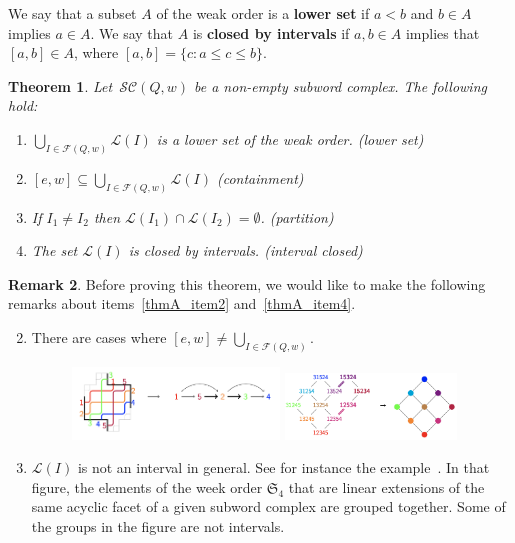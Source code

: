 \documentclass{amsart}
\newtheorem{theorem}{Theorem}[section]
\theoremstyle{definition}
\newtheorem{remark}[theorem]{Remark}
\newcommand{\defn}[1]{\textbf{\textsf{\color{PineGreen} #1}}} %
\newcommand{\cesarm}[1]{\todo[color=orange!30]{#1 \\ \hfill --- C.}}
\newcommand{\linearExtensions}{\mathcal{L}} %
\newcommand{\subwordComplex}{\mathcal{SC}} %
\newcommand{\subwordFacets}{\mathcal{F}} %
\begin{document}
We say that a subset $A$ of the weak order is a \defn{lower set} if $a<b$ and $b\in A$ implies $a\in A$. 
We say that $A$ is \defn{closed by intervals} if $a,b\in A$ implies that $[a,b]\in A$, where $[a,b]=\{c: a \leq c\leq b\}$.

\begin{theorem}\label{thm_subword_linearextensions_A}
Let~$\subwordComplex(Q,w)$ be a non-empty subword complex. The following hold:
\begin{enumerate}
\item  $\bigcup_{I\in\subwordFacets(Q,w)} \linearExtensions(I)$ is a lower set of the weak order. 
\label{thmA_item1}
\hfill (lower set)
\item $[e,w] \subseteq \bigcup_{I\in\subwordFacets(Q,w)} \linearExtensions(I)$ 
\label{thmA_item2}
\hfill (containment)
\item If $I_1\neq I_2$ then $\linearExtensions(I_1)\cap \linearExtensions(I_2)=\emptyset$. 
\label{thmA_item3}
\hfill (partition)
\item The set $\linearExtensions(I)$ is closed by intervals. 
\label{thmA_item4}
\hfill (interval closed) 
\end{enumerate}
\end{theorem}

\begin{remark}\label{rem_thmA}
Before proving this theorem, we would like to make the following remarks about items~\eqref{thmA_item2} and~\eqref{thmA_item4}.
\begin{enumerate}
  \setcounter{enumi}{1}
\item There are cases where $[e,w] \neq \bigcup_{I\in\subwordFacets(Q,w)}$. \cesarm{add discussion}
\begin{figure}[h]
\includegraphics[width=0.52\textwidth]{interval_not_contained1} \quad
\includegraphics[width=0.43\textwidth]{interval_not_contained2}
\end{figure}
  \setcounter{enumi}{3}
\item $\linearExtensions(I)$ is not an interval in general. See for instance the example~\cite[Figure~9]{PilaudStump-brickPolytope}. 
In that figure, the elements of the week order $\mathfrak{S}_4$ that are linear extensions of the same acyclic facet of a given subword complex are grouped together. Some of the groups in the figure are not intervals.  \\
\end{enumerate}
\end{remark}
\end{document}
